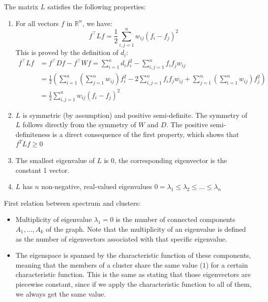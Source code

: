 The matrix $L$ satisfies the following properties:
\begin{enumerate}
	\item For all vectors $f$ in $\mathbb{R}^n$, we have:
	$$f ^ { \top } L f = \frac { 1 } { 2 } \sum _ { i, j = 1 } ^ { n } w _ { i j } \left( f _ { i } - f _ { j } \right) ^ { 2 }$$
	This is proved by the definition of $d_i$:
	$$\begin{aligned} 
	f ^ { \top } L f & = f ^ { \top } D f - f ^ { \top } W f = \sum _ { i=1 }^n d _ { i } f _ { i } ^ { 2 } - \sum _ { i , j =1 }^n f _ { i } f _ { j } w _ { i j } \\ 
	& = \frac { 1 } { 2 } \left( \sum _ { i=1 }^n \left( \sum _ { j=1 }^n w _ { i j } \right) f _ { i } ^ { 2 } - 2 \sum _ { i, j=1 }^n f _ { i } f _ { j } w _ { i j } + \sum _ { j=1 }^n \left( \sum _ { i=1 }^n w _ { i j } \right) f _ { j } ^ { 2 } \right) \\ 
	& = \frac { 1 } { 2 } \sum _ { i ,j=1 }^n w _ { i j } \left( f _ { i } - f _ { j } \right) ^ { 2 } 
	\end{aligned}$$
	 
	\item $L$ is symmetric (by assumption) and positive semi-definite. The symmetry of $L$ follows directly from the symmetry of $W$ and $D$. The positive semi-definiteness is a direct consequence of the first property, which shows that 	$f ^ { T } L f \geq 0$
	 
	\item The smallest eigenvalue of $L$ is 0, the corresponding eigenvector is the constant 1 vector.
	\item $L$ has $n$ non-negative, real-valued eigenvalues $0 = \lambda _ { 1 } \leq \lambda _ { 2 } \leq \ldots \leq \lambda _ { n }$
\end{enumerate}

First relation between spectrum and clusters:
\begin{itemize}
	\item Multiplicity of eigenvalue $\lambda_1=0$ is the number of connected components $A_1, \dots, A_k$ of the graph. Note that the multiplicity of an eigenvalue is defined as the number of eigenvectors associated with that specific eigenvalue.
	\item The eigenspace is spanned by the characteristic function of these components, meaning that the members of a cluster share the same value ($1$) for a certain characteristic function. This is the same as stating that those eigenvectors are piecewise constant, since if we apply the characteristic function to all of them, we always get the same value.
\end{itemize}


